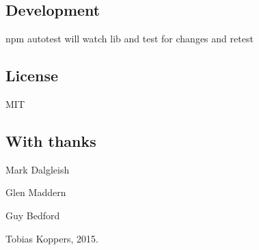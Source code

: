 \subsection*{Development}


\begin{DoxyItemize}
\item {\ttfamily npm autotest} will watch {\ttfamily lib} and {\ttfamily test} for changes and retest
\end{DoxyItemize}

\subsection*{License}

M\+IT

\subsection*{With thanks}


\begin{DoxyItemize}
\item Mark Dalgleish
\item Glen Maddern
\item Guy Bedford 

 Tobias Koppers, 2015. 
\end{DoxyItemize}